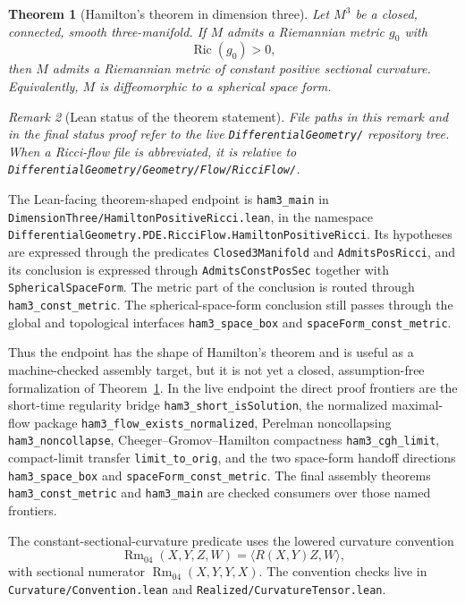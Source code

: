 \documentclass[11pt]{article}
\theoremstyle{plain}
\newtheorem{theorem}{Theorem}[section]
\theoremstyle{definition}
\theoremstyle{remark}
\newtheorem{remark}[theorem]{Remark}
\newcommand{\Ric}{\operatorname{Ric}}
\newcommand{\Rm}{\operatorname{Rm}}
\newcommand{\leanref}[1]{\nolinkurl{#1}}
\newcommand{\leanfile}[1]{\nolinkurl{#1}}
\newcommand{\rffile}[1]{\leanfile{#1}}
\begin{document}
\begin{theorem}[Hamilton's theorem in dimension three]
\label{thm:main-hamilton-3d}
Let $M^3$ be a closed, connected, smooth three-manifold. If $M$ admits a
Riemannian metric $g_0$ with
\[
\Ric(g_0)>0,
\]
then $M$ admits a Riemannian metric of constant positive sectional curvature.
Equivalently, $M$ is diffeomorphic to a spherical space form.
\end{theorem}

\begin{remark}[Lean status of the theorem statement]
\emph{File paths in this remark and in the final status proof refer to the live
\textnormal{\texttt{DifferentialGeometry/}} repository tree.  When a Ricci-flow
file is abbreviated, it is relative to
\textnormal{\texttt{DifferentialGeometry/Geometry/Flow/RicciFlow/}}.}

The Lean-facing theorem-shaped endpoint is
\leanref{ham3_main} in
\rffile{DimensionThree/HamiltonPositiveRicci.lean}, in the namespace
\leanref{DifferentialGeometry.PDE.RicciFlow.HamiltonPositiveRicci}.  Its
hypotheses are expressed through the
predicates \leanref{Closed3Manifold} and \leanref{AdmitsPosRicci}, and its
conclusion is expressed through \leanref{AdmitsConstPosSec} together with
\leanref{SphericalSpaceForm}.  The metric part of the conclusion is routed
through \leanref{ham3_const_metric}.  The spherical-space-form conclusion still
passes through the global and topological interfaces \leanref{ham3_space_box}
and \leanref{spaceForm_const_metric}.

Thus the endpoint has the shape of Hamilton's theorem and is useful as a
machine-checked assembly target, but it is not yet a closed, assumption-free
formalization of Theorem~\ref{thm:main-hamilton-3d}.  In the live endpoint the
direct proof frontiers are the short-time regularity bridge
\leanref{ham3_short_isSolution}, the normalized maximal-flow package
\leanref{ham3_flow_exists_normalized}, Perelman noncollapsing
\leanref{ham3_noncollapse}, Cheeger--Gromov--Hamilton compactness
\leanref{ham3_cgh_limit}, compact-limit transfer \leanref{limit_to_orig}, and
the two space-form handoff directions \leanref{ham3_space_box} and
\leanref{spaceForm_const_metric}.  The final assembly theorems
\leanref{ham3_const_metric} and \leanref{ham3_main} are checked consumers over
those named frontiers.

The constant-sectional-curvature predicate uses the lowered curvature
convention
\[
  \Rm_{04}(X,Y,Z,W)=\langle R(X,Y)Z,W\rangle,
\]
with sectional numerator \(\Rm_{04}(X,Y,Y,X)\).  The convention checks live in
\rffile{Curvature/Convention.lean} and
\rffile{Realized/CurvatureTensor.lean}.
\end{remark}
\end{document}
